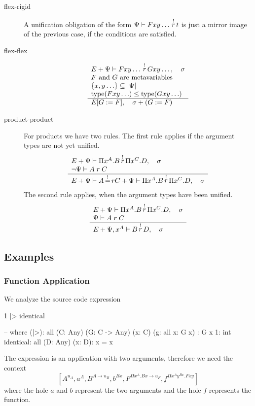 \begin{description}
\item[flex-rigid]

A unification obligation of the form $\Psi \vdash F x y \ldots {\,\stackrel{!}{r}\,}
t$ is just a mirror image of the previous case, if the conditions are satisfied.



\item[flex-flex]

$$
\begin{array}{l} 
    E + \Psi \vdash F x y \ldots {\,\stackrel{!}{r}\,} G x y \ldots,
    \quad \sigma
    \\
    \text{$F$ and $G$ are metavariables}
    \\
    \{x, y \ldots\} \subseteq |\Psi|
    \\
    \text{type}(F x y \ldots) \le \text{type}(G x y \ldots)
 \\ \hline 
    E[G := F], \quad \sigma + (G := F)
\end{array}
$$





\item[product-product]

For products we have two rules. The first rule applies if the argument types are
not yet unified.
$$
\begin{array}{l} 
    E + \Psi \vdash \Pi x^A.B {\,\stackrel{!}{r}\,} \Pi x^C. D, \quad \sigma
    \\
    \lnot \Psi \vdash A \mathrel{r} C
 \\ \hline 
    E
    + \Psi \vdash A {\,\stackrel{!}{=}\,}{r} C
    + \Psi \vdash \Pi x^A.B {\,\stackrel{!}{r}\,} \Pi x^C. D,
    \quad \sigma
\end{array}
$$
%
The second rule applies, when the argument types have been unified.
$$
\begin{array}{l} 
    E + \Psi \vdash \Pi x^A.B {\,\stackrel{!}{r}\,} \Pi x^C. D, \quad \sigma
    \\
    \Psi \vdash A \mathrel{r} C
 \\ \hline 
    E
    + \Psi,x^A \vdash B {\,\stackrel{!}{r}\,} D
    ,\quad \sigma
\end{array}
$$


\end{description}



\subsection{Examples}


\subsubsection {Function Application}

We analyze the source code expression
\begin{alba}
    1 |> identical

    -- where
    (|>): all (C: Any) (G: C -> Any) (x: C) (g: all x: G x) : G x
    1: int
    identical: all (D: Any) (x: D): x = x
\end{alba}
%
The expression  is an application with two arguments,
therefore we need the context
$$
    [
        A^{u_A}, a^A,
        B^{A\to u_B}, b^{Bx},
        F^{\Pi x^A. B x \to u_F}, f^{\Pi x^A y^{Bx}. F x y}
    ]
$$
%
where the hole $a$ and $b$ represent the two arguments and the hole $f$
represents the function.



